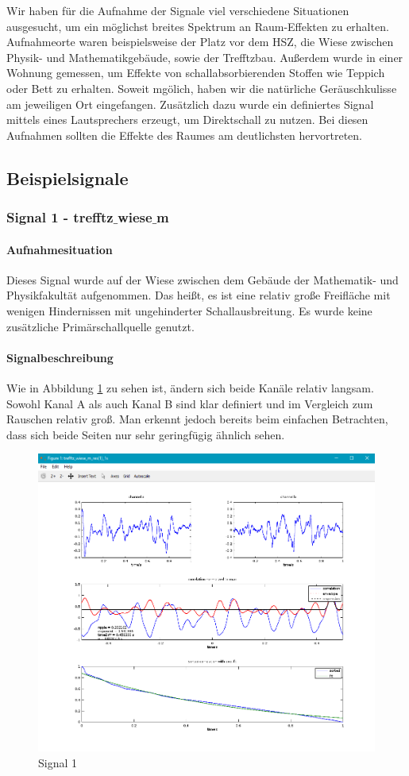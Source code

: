 Wir haben für die Aufnahme der Signale viel verschiedene Situationen ausgesucht, um ein möglichst breites Spektrum an Raum-Effekten zu erhalten. Aufnahmeorte waren beispielsweise der Platz vor dem HSZ, die Wiese zwischen Physik- und Mathematikgebäude, sowie der Trefftzbau. Außerdem wurde in einer Wohnung gemessen, um Effekte von schallabsorbierenden Stoffen wie Teppich oder Bett zu erhalten. Soweit mgölich, haben wir die natürliche Geräuschkulisse am jeweiligen Ort eingefangen. Zusätzlich dazu wurde ein definiertes Signal mittels eines Lautsprechers erzeugt, um Direktschall zu nutzen. Bei diesen Aufnahmen sollten die Effekte des Raumes am deutlichsten hervortreten.
\subsection{Beispielsignale}
\subsubsection{Signal 1 - trefftz$\_$wiese$\_$m}
\paragraph{Aufnahmesituation} Dieses Signal wurde auf der Wiese zwischen dem Gebäude der Mathematik- und Physikfakultät aufgenommen. Das heißt, es ist eine relativ große Freifläche mit wenigen Hindernissen mit ungehinderter Schallausbreitung. Es wurde keine zusätzliche Primärschallquelle genutzt.
\paragraph{Signalbeschreibung} Wie in Abbildung \ref{figure2} zu sehen ist, ändern sich beide Kanäle relativ langsam. Sowohl Kanal A als auch Kanal B sind klar definiert und im Vergleich zum Rauschen relativ groß. Man erkennt jedoch bereits beim einfachen Betrachten, dass sich beide Seiten nur sehr geringfügig ähnlich sehen.
\begin{figure}[ht!]
\centering
\includegraphics[scale=0.64]{img/trefftz_wiese_m}
\caption{Signal 1}
\label{figure2}
\end{figure}
